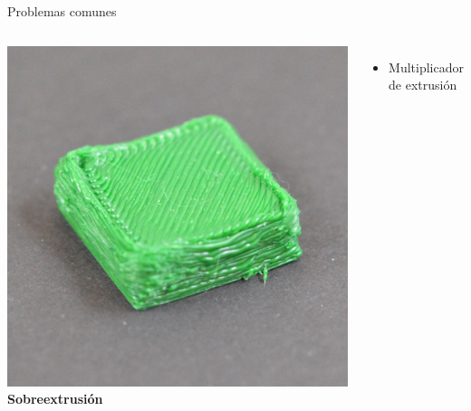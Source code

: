 \documentclass{beamer}
\begin{document}
	\begin{frame}{Problemas comunes}
		\begin{columns}
				\includegraphics[width=\textwidth]{images/Over-Extruding}
				\textbf{Sobreextrusión}
				\begin{itemize}
					\item Multiplicador de extrusión
				\end{itemize}
		\end{columns}
	\end{frame}
\end{document}
